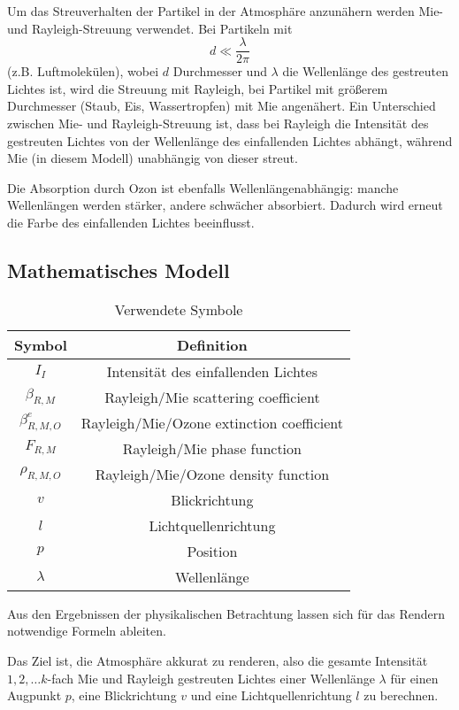 Um das Streuverhalten der Partikel in der Atmosphäre anzunähern werden Mie- und Rayleigh-Streuung verwendet. Bei
Partikeln mit
\begin{equation}
	d \ll \frac{\lambda}{2\pi}
\end{equation}
(z.B. Luftmolekülen), wobei $d$ Durchmesser und $\lambda$ die Wellenlänge des gestreuten Lichtes ist, wird die Streuung
mit Rayleigh, bei Partikel mit größerem Durchmesser (Staub, Eis, Wassertropfen) mit Mie angenähert. Ein Unterschied
zwischen Mie- und Rayleigh-Streuung ist, dass bei Rayleigh die Intensität des gestreuten Lichtes von der Wellenlänge des
einfallenden Lichtes abhängt, während Mie (in diesem Modell) unabhängig von dieser streut.

Die Absorption durch Ozon ist ebenfalls Wellenlängenabhängig: manche Wellenlängen werden stärker, andere schwächer
absorbiert. Dadurch wird erneut die Farbe des einfallenden Lichtes beeinflusst.

\subsection{Mathematisches Modell}
\begin{table}
	\centering
	\begin{tabular}{| c | c |}
	\hline
	Symbol & Definition\\ \hline
	$I_I$ & Intensität des einfallenden Lichtes\\
	$\beta_{R,M}$ & Rayleigh/Mie scattering coefficient\\
	$\beta^e_{R,M,O}$ & Rayleigh/Mie/Ozone extinction coefficient\\
	$F_{R,M}$ & Rayleigh/Mie phase function\\
	$\rho_{R,M,O}$ & Rayleigh/Mie/Ozone density function\\
	$v$ & Blickrichtung\\
	$l$ & Lichtquellenrichtung\\
	$p$ & Position\\
	$\lambda$ & Wellenlänge\\ \hline
	\end{tabular}
	\caption{Verwendete Symbole}
	\label{symbols}
\end{table}

Aus den Ergebnissen der physikalischen Betrachtung lassen sich für das Rendern notwendige Formeln ableiten.

Das Ziel ist, die Atmosphäre akkurat zu renderen, also die gesamte Intensität $1,2, \dots k$-fach Mie und Rayleigh
gestreuten Lichtes einer Wellenlänge $\lambda$ für einen Augpunkt $p$, eine Blickrichtung $v$ und eine
Lichtquellenrichtung $l$ zu berechnen.


